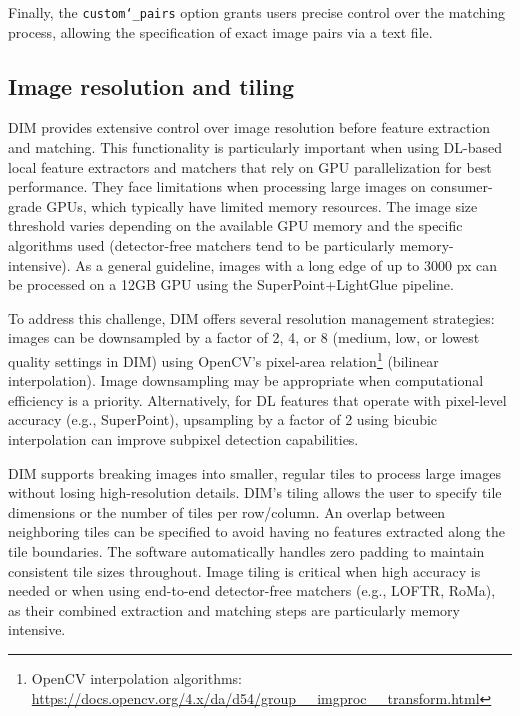 Finally, the \texttt{custom\char`_pairs} option grants users precise control over the matching process, allowing the specification of exact image pairs via a text file. 

\subsection{Image resolution and tiling}\label{sec:5:tiling}

DIM provides extensive control over image resolution before feature extraction and matching. 
This functionality is particularly important when using DL-based local feature extractors and matchers that rely on GPU parallelization for best performance. 
They face limitations when processing large images on consumer-grade GPUs, which typically have limited memory resources. 
The image size threshold varies depending on the available GPU memory and the specific algorithms used (detector-free matchers tend to be particularly memory-intensive). 
As a general guideline, images with a long edge of up to 3000 px can be processed on a 12GB GPU using the SuperPoint+LightGlue pipeline. 

To address this challenge, DIM offers several resolution management strategies: images can be downsampled by a factor of 2, 4, or 8 (medium, low, or lowest quality settings in DIM) using OpenCV's pixel-area relation\footnote{OpenCV interpolation algorithms: \url{https://docs.opencv.org/4.x/da/d54/group__imgproc__transform.html}} (bilinear interpolation). 
Image downsampling may be appropriate when computational efficiency is a priority. Alternatively, for DL features that operate with pixel-level accuracy (e.g., SuperPoint), upsampling by a factor of 2 using bicubic interpolation can improve subpixel detection capabilities.  

DIM supports breaking images into smaller, regular tiles to process large images without losing high-resolution details.
DIM's tiling allows the user to specify tile dimensions or the number of tiles per row/column.
An overlap between neighboring tiles can be specified to avoid having no features extracted along the tile boundaries. 
The software automatically handles zero padding to maintain consistent tile sizes throughout. 
Image tiling is critical when high accuracy is needed or when using end-to-end detector-free matchers (e.g., LOFTR, RoMa), as their combined extraction and matching steps are particularly memory intensive. 

